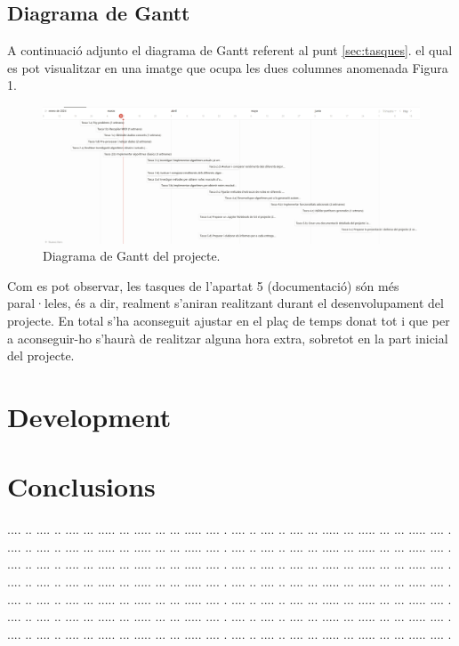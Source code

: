 ﻿\documentclass[10pt,a4paper,twocolumn,twoside]{article}
\begin{document}
\subsection{Diagrama de Gantt}
\label{subsec-diagrama-de-Gantt}

A continuació adjunto el diagrama de Gantt referent al punt \ref{sec:tasques}. el qual es pot visualitzar en una imatge que ocupa les dues columnes anomenada Figura 1.
\begin{figure}[htbp]
    \centering
    \includegraphics[width=\textwidth]{img/Diagrama de Gantt Claro Fecha.png}
    \caption{Diagrama de Gantt del projecte.}
    \label{fig:gantt}
\end{figure}

Com es pot observar, les tasques de l'apartat 5 (documentació) són més paral·leles, és a dir, realment s'aniran realitzant durant el desenvolupament del projecte.
En total s'ha aconseguit ajustar en el plaç de temps donat tot i que per a aconseguir-ho s'haurà de realitzar alguna hora extra, sobretot en la part inicial del projecte.

\section{Development}


\section{Conclusions}

.... ..  .... .. .... ... ..... ... ..... ... ... ..... .... .
.... ..  .... .. .... ... ..... ... ..... ... ... ..... .... .
.... ..  .... .. .... ... ..... ... ..... ... ... ..... .... .
.... ..  .... .. .... ... ..... ... ..... ... ... ..... .... .
.... ..  .... .. .... ... ..... ... ..... ... ... ..... .... .
.... ..  .... .. .... ... ..... ... ..... ... ... ..... .... .
.... ..  .... .. .... ... ..... ... ..... ... ... ..... .... .
.... ..  .... .. .... ... ..... ... ..... ... ... ..... .... .
.... ..  .... .. .... ... ..... ... ..... ... ... ..... .... .
.... ..  .... .. .... ... ..... ... ..... ... ... ..... .... .
.... ..  .... .. .... ... ..... ... ..... ... ... ..... .... .
.... ..  .... .. .... ... ..... ... ..... ... ... ..... .... .
.... ..  .... .. .... ... ..... ... ..... ... ... ..... .... .
.... ..  .... .. .... ... ..... ... ..... ... ... ..... .... .
\end{document}
